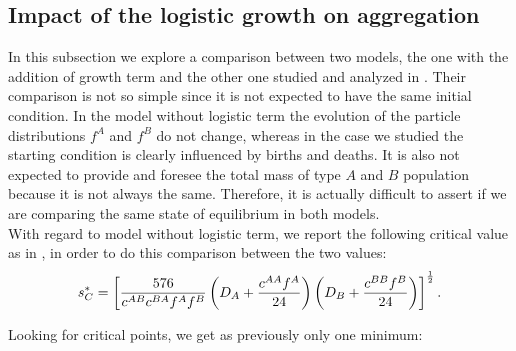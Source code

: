 \subsection{Impact of the logistic growth on aggregation}
In this subsection we explore a comparison between two models, the one with the addition of growth term and the other one studied and analyzed in \cite{twoparticule}.
Their comparison is not so simple since it is not expected to have the same initial condition. In the model without logistic term the evolution of the particle distributions $f^{A}$ and $f^{B}$ do not change, whereas in the case we studied the starting condition is clearly influenced by births and deaths.
It is also not expected to provide and foresee the total mass of type $A$ and $B$ population because it is not always the same. Therefore, it is actually difficult to assert if we are comparing the same state of equilibrium in both models. \\
With regard to model without logistic term, we report the following critical value as in \cite{twoparticule}, in order to do this comparison between the two values:
\begin{equation}
 {s^{*}_{C}}= \left[\frac{576}{{c^{AB}} {c^{BA}} {f^{A}} {f^{B}}} \left( D_A+\frac{{c^{AA}}{f^{A}}}{24} \right) \left(D_B+\frac{{c^{BB}}{f^{B}}}{24} \right) \right]^{\frac{1}{2}}. 
\end{equation}

%              
% 
Looking for critical points, we get as previously only one minimum:

